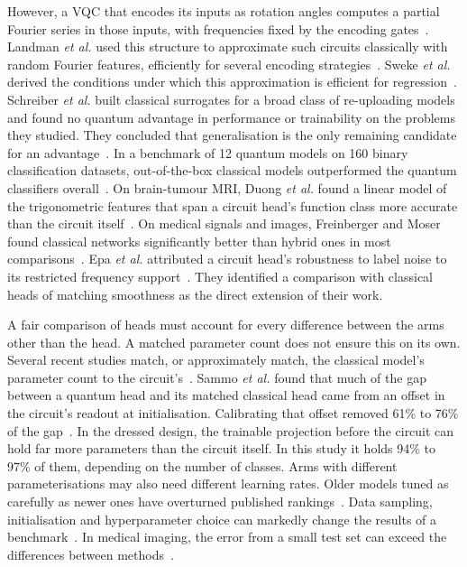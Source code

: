 \documentclass{ieeeaccess}
\newcommand{\vqc}{VQC}
\begin{document}
However, a \vqc{} that encodes its inputs as rotation angles computes a partial Fourier series in those inputs, with frequencies fixed by the encoding gates~\cite{schuld2021}. Landman \emph{et al.} used this structure to approximate such circuits classically with random Fourier features, efficiently for several encoding strategies~\cite{landman2023}. Sweke \emph{et al.} derived the conditions under which this approximation is efficient for regression~\cite{sweke2025}. Schreiber \emph{et al.} built classical surrogates for a broad class of re-uploading models~\cite{perezsalinas2020} and found no quantum advantage in performance or trainability on the problems they studied. They concluded that generalisation is the only remaining candidate for an advantage~\cite{schreiber2023}. In a benchmark of 12 quantum models on 160 binary classification datasets, out-of-the-box classical models outperformed the quantum classifiers overall~\cite{bowles2024}. On brain-tumour MRI, Duong \emph{et al.} found a linear model of the trigonometric features that span a circuit head's function class more accurate than the circuit itself~\cite{duong2026}. On medical signals and images, Freinberger and Moser found classical networks significantly better than hybrid ones in most comparisons~\cite{freinberger2026}. Epa \emph{et al.} attributed a circuit head's robustness to label noise to its restricted frequency support~\cite{epa2026}. They identified a comparison with classical heads of matching smoothness as the direct extension of their work.

A fair comparison of heads must account for every difference between the arms other than the head. A matched parameter count does not ensure this on its own. Several recent studies match, or approximately match, the classical model's parameter count to the circuit's~\cite{martinperez2026,rubinos2026,epa2026}. Sammo \emph{et al.} found that much of the gap between a quantum head and its matched classical head came from an offset in the circuit's readout at initialisation. Calibrating that offset removed 61\% to 76\% of the gap~\cite{sammo2026}. In the dressed design, the trainable projection before the circuit can hold far more parameters than the circuit itself. In this study it holds 94\% to 97\% of them, depending on the number of classes. Arms with different parameterisations may also need different learning rates. Older models tuned as carefully as newer ones have overturned published rankings~\cite{melis2018}. Data sampling, initialisation and hyperparameter choice can markedly change the results of a benchmark~\cite{bouthillier2021}. In medical imaging, the error from a small test set can exceed the differences between methods~\cite{varoquaux2022}.
\end{document}
